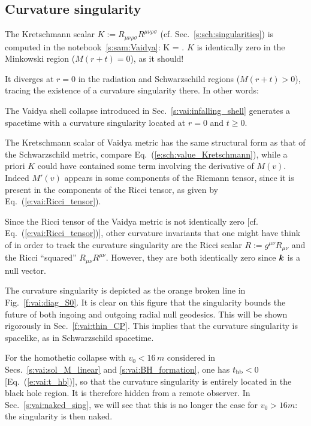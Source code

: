 \subsection{Curvature singularity} \label{s:vai:thin:sing}

The Kretschmann scalar
$K := R_{\mu\nu\rho\sigma} R^{\mu\nu\rho\sigma}$
(cf. Sec.~\ref{s:sch:singularities})
is computed in the notebook~\ref{s:sam:Vaidya}:
\be \label{e:vai:Kretschmann}
    K =  .
\ee
$K$ is identically zero in the Minkowski region ($M(r+t) = 0$), as it should!

It diverges at $r=0$ in the radiation and Schwarzschild regions ($M(r+t) > 0$), tracing the
existence of a curvature singularity there.
In other words:
\begin{greybox}
The Vaidya shell collapse introduced in Sec.~\ref{s:vai:infalling_shell}
generates a spacetime with a curvature singularity
located at $r=0$ and $t \geq 0$.
\end{greybox}

\begin{remark}
The Kretschmann scalar of Vaidya metric has the same structural form
as that of the Schwarzschild metric, compare Eq.~(\ref{e:sch:value_Kretschmann}),
while a priori $K$ could have
contained some term involving the derivative of $M(v)$. Indeed $M'(v)$
appears in some components of the Riemann tensor, since it is present in the
components of the Ricci tensor, as given by Eq.~(\ref{e:vai:Ricci_tensor}).
\end{remark}

\begin{remark}
Since the Ricci tensor of the Vaidya metric is not identically zero
[cf. Eq.~(\ref{e:vai:Ricci_tensor})], other curvature invariants that one might
have think of in order to track the curvature singularity are the Ricci scalar $R := g^{\mu\nu} R_{\mu\nu}$
and the Ricci ``squared'' $R_{\mu\nu} R^{\mu\nu}$. However, they are both identically zero
since $\bm{k}$ is a null vector.
\end{remark}

The curvature singularity is depicted as the orange broken line in Fig.~\ref{f:vai:diag_S0}.
It is clear on this figure that the singularity bounds the future of both ingoing and outgoing radial null geodesics.
This will be shown rigorously in Sec.~\ref{f:vai:thin_CP}.
This implies that the curvature singularity is spacelike, as in Schwarzschild spacetime.

For the homothetic collapse with $v_0 < 16\, m$ considered in Secs.~\ref{s:vai:sol_M_linear} and
\ref{s:vai:BH_formation}, one has $t_{\rm hb} < 0$ [Eq.~(\ref{e:vai:t_hb})], so that
the curvature singularity is entirely located in the black hole region. It is therefore hidden
from a remote observer. In Sec.~\ref{s:vai:naked_sing}, we will see that this is no longer the
case for $v_0 > 16 m$: the singularity is then naked.

